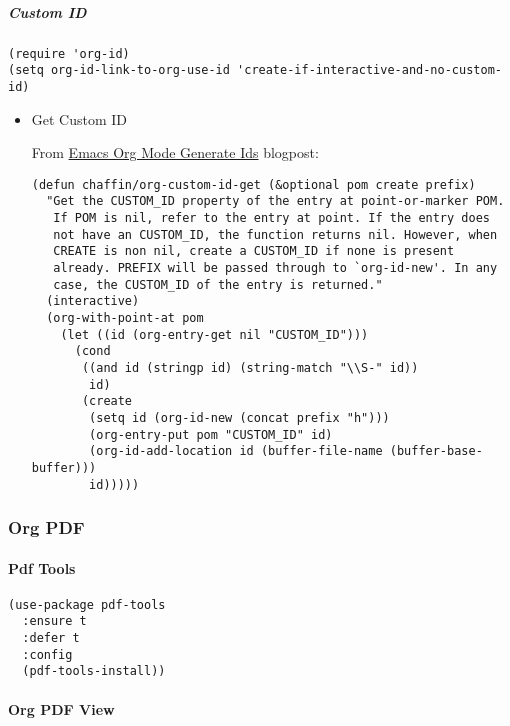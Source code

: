 \documentclass[11pt]{article}
\begin{document}
\subparagraph*{Custom ID}
\label{sec:orgc4a8dd4}

\begin{verbatim}
(require 'org-id)
(setq org-id-link-to-org-use-id 'create-if-interactive-and-no-custom-id)
\end{verbatim}


\begin{itemize}
\item Get Custom ID
\label{sec:org432a77c}

From \href{https://writequit.org/articles/emacs-org-mode-generate-ids.html}{Emacs Org Mode Generate Ids} blogpost:

\begin{verbatim}
(defun chaffin/org-custom-id-get (&optional pom create prefix)
  "Get the CUSTOM_ID property of the entry at point-or-marker POM.
   If POM is nil, refer to the entry at point. If the entry does
   not have an CUSTOM_ID, the function returns nil. However, when
   CREATE is non nil, create a CUSTOM_ID if none is present
   already. PREFIX will be passed through to `org-id-new'. In any
   case, the CUSTOM_ID of the entry is returned."
  (interactive)
  (org-with-point-at pom
    (let ((id (org-entry-get nil "CUSTOM_ID")))
      (cond
       ((and id (stringp id) (string-match "\\S-" id))
        id)
       (create
        (setq id (org-id-new (concat prefix "h")))
        (org-entry-put pom "CUSTOM_ID" id)
        (org-id-add-location id (buffer-file-name (buffer-base-buffer)))
        id)))))
\end{verbatim}
\end{itemize}

\subsubsection*{Org PDF}
\label{sec:org5a1d4da}

\paragraph*{Pdf Tools}
\label{sec:org2150c5b}

\begin{verbatim}
(use-package pdf-tools
  :ensure t
  :defer t
  :config
  (pdf-tools-install))
\end{verbatim}

\paragraph*{Org PDF View}
\label{sec:org59f9cde}
\end{document}
